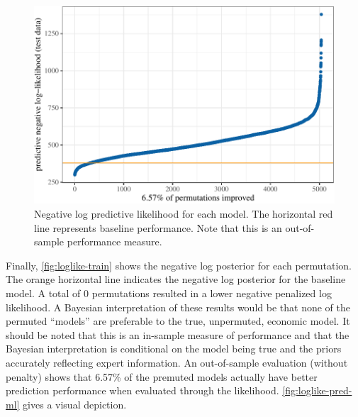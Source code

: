 \documentclass[11pt]{article}
\begin{document}
\begin{figure}[t]

{\centering \includegraphics{gfx/loglike-pred-ml-1} 

}

\caption{Negative log predictive likelihood for each model. The horizontal red line represents baseline performance. Note that this is an out-of-sample performance measure.}\label{fig:loglike-pred-ml}
\end{figure}

Finally, \autoref{fig:loglike-train} shows the negative log posterior
for each permutation. The orange horizontal line indicates the negative
log posterior for the baseline model. A total of 0 permutations resulted
in a lower negative penalized log likelihood. A Bayesian interpretation
of these results would be that none of the permuted ``models'' are
preferable to the true, unpermuted, economic model. It should be noted
that this is an in-sample measure of performance and that the Bayesian
interpretation is conditional on the model being true and the priors
accurately reflecting expert information. An out-of-sample evaluation
(without penalty) shows that 6.57\% of the premuted models actually have
better prediction performance when evaluated through the likelihood.
\autoref{fig:loglike-pred-ml} gives a visual depiction.

\begin{table}

\caption{\label{tab:best-results}Series MSEs for SW and top models.}
\centering
{}
\end{table}
\end{document}
